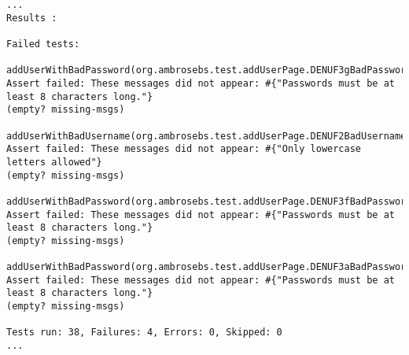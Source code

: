 \documentclass{article}
\begin{document}
\begin{lstlisting}[caption=An excerpt from the test report after seeded faults]
...
Results :

Failed tests: 
  addUserWithBadPassword(org.ambrosebs.test.addUserPage.DENUF3gBadPasswordTest): Assert failed: These messages did not appear: #{"Passwords must be at least 8 characters long."}
(empty? missing-msgs)
  addUserWithBadUsername(org.ambrosebs.test.addUserPage.DENUF2BadUsernameTest): Assert failed: These messages did not appear: #{"Only lowercase letters allowed"}
(empty? missing-msgs)
  addUserWithBadPassword(org.ambrosebs.test.addUserPage.DENUF3fBadPasswordTest): Assert failed: These messages did not appear: #{"Passwords must be at least 8 characters long."}
(empty? missing-msgs)
  addUserWithBadPassword(org.ambrosebs.test.addUserPage.DENUF3aBadPasswordTest): Assert failed: These messages did not appear: #{"Passwords must be at least 8 characters long."}
(empty? missing-msgs)

Tests run: 38, Failures: 4, Errors: 0, Skipped: 0
...
\end{lstlisting}
\end{document}

